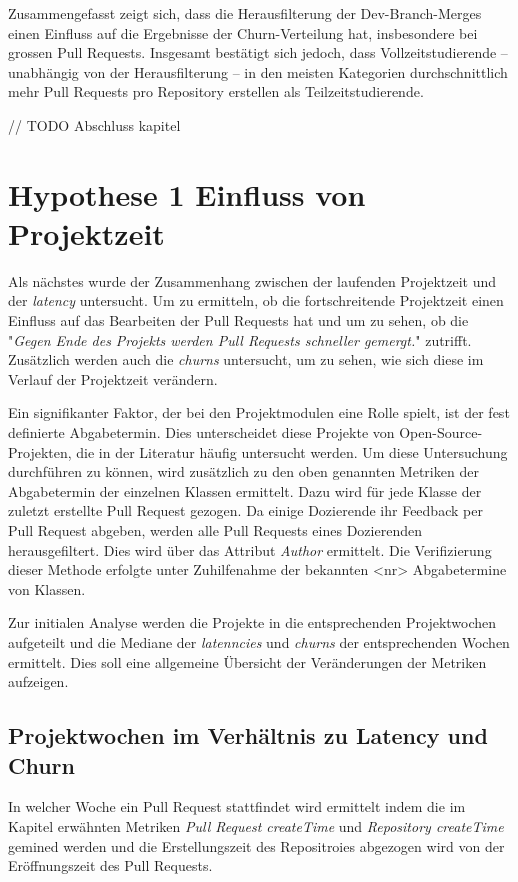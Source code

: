 Zusammengefasst zeigt sich, dass die Herausfilterung der Dev-Branch-Merges einen Einfluss auf die Ergebnisse der Churn-Verteilung hat, insbesondere bei grossen Pull Requests. Insgesamt bestätigt sich jedoch, dass Vollzeitstudierende – unabhängig von der Herausfilterung – in den meisten Kategorien durchschnittlich mehr Pull Requests pro Repository erstellen als Teilzeitstudierende.

// TODO Abschluss kapitel

\section{Hypothese 1 Einfluss von Projektzeit}
Als nächstes wurde der Zusammenhang zwischen der laufenden Projektzeit und der \textit{latency} untersucht. Um zu ermitteln, ob die fortschreitende Projektzeit einen Einfluss auf das Bearbeiten der Pull Requests hat und um zu sehen, ob die  "\textit{Gegen Ende des Projekts werden Pull Requests schneller gemergt.}" zutrifft. Zusätzlich werden auch die \textit{churns} untersucht, um zu sehen, wie sich diese im Verlauf der Projektzeit verändern. 

Ein signifikanter Faktor, der bei den Projektmodulen eine Rolle spielt, ist der fest definierte Abgabetermin. Dies unterscheidet diese Projekte von Open-Source-Projekten, die in der Literatur häufig untersucht werden. Um diese Untersuchung durchführen zu können, wird zusätzlich zu den oben genannten Metriken der Abgabetermin der einzelnen Klassen ermittelt. Dazu wird für jede Klasse der zuletzt erstellte Pull Request gezogen. Da einige Dozierende ihr Feedback per Pull Request abgeben, werden alle Pull Requests eines Dozierenden herausgefiltert. Dies wird über das Attribut \textit{Author} ermittelt. Die Verifizierung dieser Methode erfolgte unter Zuhilfenahme der bekannten <nr> Abgabetermine von Klassen.

Zur initialen Analyse werden die Projekte in die entsprechenden Projektwochen aufgeteilt und die Mediane der \textit{latenncies} und \textit{churns} der entsprechenden Wochen ermittelt. Dies soll eine allgemeine Übersicht der Veränderungen der Metriken aufzeigen.

\subsection{Projektwochen im Verhältnis zu Latency und Churn}
\label{sec:ProjektwochenLatencyChurn}
In welcher Woche ein Pull Request stattfindet wird ermittelt indem die im Kapitel  erwähnten Metriken \textit{Pull Request createTime} und \textit{Repository createTime} gemined werden und die Erstellungszeit des Repositroies abgezogen wird von der Eröffnungszeit des Pull Requests. 


